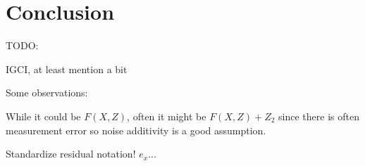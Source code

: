 \chapter{Conclusion}

TODO:

IGCI, at least mention a bit

Some observations:

While it could be $F(X, Z)$, often it might be $F(X, Z) + Z_2$ since there is often measurement error
so noise additivity is a good assumption. 

Standardize residual notation! $e_x$...


